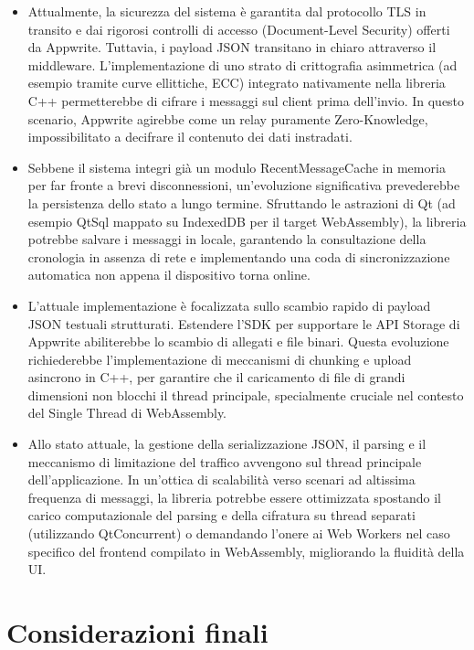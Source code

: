 \documentclass[a4paper, 11pt, twoside]{report}
\begin{document}
\begin{itemize}
\item Attualmente, la sicurezza del sistema è garantita dal protocollo TLS in transito e dai rigorosi controlli di accesso (Document-Level
Security) offerti da Appwrite. Tuttavia, i payload JSON transitano in chiaro attraverso il middleware. L'implementazione di uno strato di
crittografia asimmetrica (ad esempio tramite curve ellittiche, ECC) integrato nativamente nella libreria C++ permetterebbe di cifrare i
messaggi sul client prima dell'invio. In questo scenario, Appwrite agirebbe come un relay puramente Zero-Knowledge, impossibilitato a decifrare
il contenuto dei dati instradati.

\item Sebbene il sistema integri già un modulo RecentMessageCache in memoria per far fronte a brevi disconnessioni, un'evoluzione significativa
prevederebbe la persistenza dello stato a lungo termine. Sfruttando le astrazioni di Qt (ad esempio QtSql mappato su IndexedDB per il target
WebAssembly), la libreria potrebbe salvare i messaggi in locale, garantendo la consultazione della cronologia in assenza di rete e implementando
una coda di sincronizzazione automatica non appena il dispositivo torna online.

\item L'attuale implementazione è focalizzata sullo scambio rapido di payload JSON testuali strutturati. Estendere l'SDK per supportare le API
Storage di Appwrite abiliterebbe lo scambio di allegati e file binari. Questa evoluzione richiederebbe l'implementazione di meccanismi di
chunking e upload asincrono in C++, per garantire che il caricamento di file di grandi dimensioni non blocchi il thread principale, specialmente
cruciale nel contesto del Single Thread di WebAssembly.

\item Allo stato attuale, la gestione della serializzazione JSON, il parsing e il meccanismo di limitazione del traffico avvengono sul thread
principale dell'applicazione. In un'ottica di scalabilità verso scenari ad altissima frequenza di messaggi, la libreria potrebbe essere ottimizzata
spostando il carico computazionale del parsing e della cifratura su thread separati (utilizzando QtConcurrent) o demandando l'onere ai Web Workers
nel caso specifico del frontend compilato in WebAssembly, migliorando la fluidità della UI.
\end{itemize}

\section{Considerazioni finali}
\end{document}
